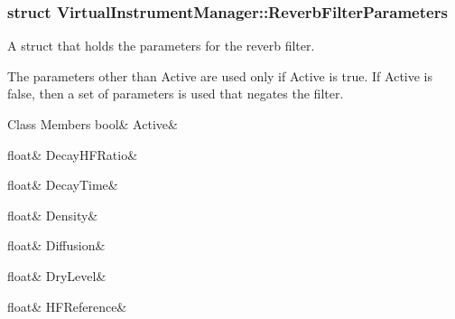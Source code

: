 \subsubsection{struct Virtual\+Instrument\+Manager\+:\+:Reverb\+Filter\+Parameters}
A struct that holds the parameters for the reverb filter. 

The parameters other than Active are used only if Active is true. If Active is false, then a set of parameters is used that negates the filter. \begin{DoxyFields}{Class Members}
\mbox{\label{group___virtual_instrument_manager_event_types_a5696ae11db74364234cfa3a1b392478b}} 
bool&
Active&
\\
\hline

\mbox{\label{group___virtual_instrument_manager_event_types_af0b0548c6e50ca27a9c7c431536de226}} 
float&
DecayHFRatio&
\\
\hline

\mbox{\label{group___virtual_instrument_manager_event_types_a0d4f06f9eb253847d91976cf4e890f94}} 
float&
DecayTime&
\\
\hline

\mbox{\label{group___virtual_instrument_manager_event_types_a50712c619ef5aa8a29743071932f97cf}} 
float&
Density&
\\
\hline

\mbox{\label{group___virtual_instrument_manager_event_types_a7f0df133bca26a8df749cb4c8a0c2fde}} 
float&
Diffusion&
\\
\hline

\mbox{\label{group___virtual_instrument_manager_event_types_a7bd1b1132e241d4326e9391ab8725a14}} 
float&
DryLevel&
\\
\hline

\mbox{\label{group___virtual_instrument_manager_event_types_aef76135465fe5a51b9cdfb0a4c6d7b8e}} 
float&
HFReference&
\\
\hline


\end{DoxyFields}
